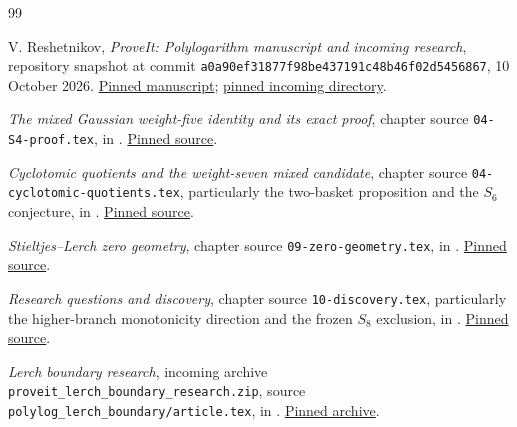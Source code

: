 \documentclass[11pt,a4paper]{article}
\theoremstyle{definition}
\theoremstyle{remark}
\numberwithin{equation}{section}
\begin{document}
\begin{thebibliography}{99}
\raggedright
{}

V. Reshetnikov, \emph{ProveIt: Polylogarithm manuscript and incoming research},
repository snapshot at commit
\texttt{a0a90ef31877f98be437191c48b46f02d5456867},
10 October 2026.
\href{https://github.com/VladimirReshetnikov/ProveIt/tree/a0a90ef31877f98be437191c48b46f02d5456867/Analysis/Polylogarithms/docs/manuscript}{Pinned manuscript};
\href{https://github.com/VladimirReshetnikov/ProveIt/tree/a0a90ef31877f98be437191c48b46f02d5456867/docs/incoming}{pinned incoming directory}.

\emph{The mixed Gaussian weight-five identity and its exact proof},
chapter source \nolinkurl{04-S4-proof.tex}, in \cite{Project}.
\href{https://github.com/VladimirReshetnikov/ProveIt/blob/a0a90ef31877f98be437191c48b46f02d5456867/Analysis/Polylogarithms/docs/manuscript/chapters/04-S4-proof.tex}{Pinned source}.

\emph{Cyclotomic quotients and the weight-seven mixed candidate},
chapter source \nolinkurl{04-cyclotomic-quotients.tex}, particularly
the two-basket proposition and the $S_6$ conjecture, in \cite{Project}.
\href{https://github.com/VladimirReshetnikov/ProveIt/blob/a0a90ef31877f98be437191c48b46f02d5456867/Analysis/Polylogarithms/docs/manuscript/chapters/04-cyclotomic-quotients.tex}{Pinned source}.

\emph{Stieltjes--Lerch zero geometry},
chapter source \nolinkurl{09-zero-geometry.tex}, in \cite{Project}.
\href{https://github.com/VladimirReshetnikov/ProveIt/blob/a0a90ef31877f98be437191c48b46f02d5456867/Analysis/Polylogarithms/docs/manuscript/chapters/09-zero-geometry.tex}{Pinned source}.

\emph{Research questions and discovery},
chapter source \nolinkurl{10-discovery.tex}, particularly the
higher-branch monotonicity direction and the frozen $S_8$ exclusion,
in \cite{Project}.
\href{https://github.com/VladimirReshetnikov/ProveIt/blob/a0a90ef31877f98be437191c48b46f02d5456867/Analysis/Polylogarithms/docs/manuscript/chapters/10-discovery.tex}{Pinned source}.

\emph{Lerch boundary research},
incoming archive \nolinkurl{proveit_lerch_boundary_research.zip},
source \nolinkurl{polylog_lerch_boundary/article.tex}, in \cite{Project}.
\href{https://github.com/VladimirReshetnikov/ProveIt/blob/a0a90ef31877f98be437191c48b46f02d5456867/docs/incoming/proveit_lerch_boundary_research.zip}{Pinned archive}.


\end{thebibliography}
\end{document}
